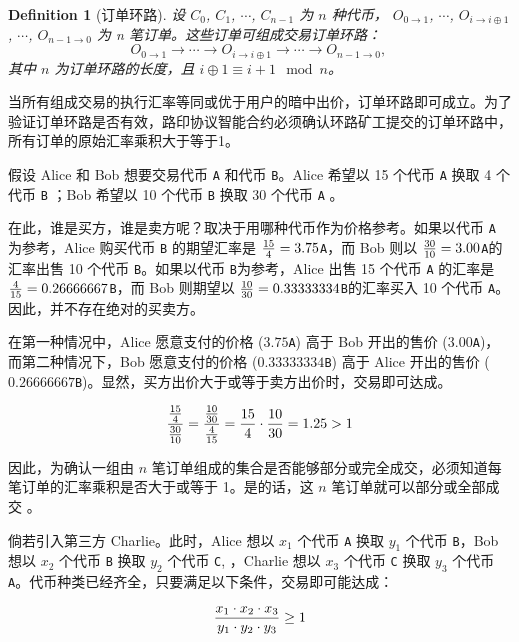 \documentclass[UTF8,nofonts]{ctexart}%
\newtheorem{definition}{Definition}[section]
\begin{document}
\begin{multicols}{2}
\begin{definition}[订单环路] 设 $C_{0}$, $C_{1}$, $\cdots$, $C_{n-1}$ 为 $n$ 种代币， $O_{0\rightarrow 1}$, $\cdots$, $O_{i\rightarrow i\oplus 1}$, $\cdots$, $O_{n-1 \rightarrow 0}$ 为 n 笔订单。这些订单可组成交易订单环路：
$$O_{0\rightarrow 1} \rightarrow \cdots \rightarrow O_{i\rightarrow i\oplus 1} \rightarrow \cdots \rightarrow O_{n-1\rightarrow 0} \text{, }$$
其中 $n$ 为订单环路的长度，且 $i\oplus 1 \equiv i+1 \mod n$。
\end{definition}

当所有组成交易的执行汇率等同或优于用户的暗中出价，订单环路即可成立。为了验证订单环路是否有效，路印协议智能合约必须确认环路矿工提交的订单环路中，所有订单的原始汇率乘积大于等于1。

假设 Alice 和 Bob 想要交易代币 \verb|A| 和代币 \verb|B|。Alice 希望以 15 个代币 \verb|A| 换取 4 个代币 \verb|B| ；Bob 希望以 10 个代币 \verb|B| 换取 30 个代币 \verb|A| 。

在此，谁是买方，谁是卖方呢？取决于用哪种代币作为价格参考。如果以代币 \verb|A| 为参考，Alice 购买代币 \verb|B| 的期望汇率是 ${15 \over 4} = 3.75$\verb|A|，而 Bob 则以 ${30 \over 10} = 3.00$\verb|A|的汇率出售 10 个代币 \verb|B|。如果以代币 \verb|B|为参考，Alice 出售 15 个代币 \verb|A| 的汇率是 ${4\over 15}=0.26666667$\verb|B|，而 Bob 则期望以 ${10 \over 30}=0.33333334$\verb|B|的汇率买入 10 个代币 \verb|A|。因此，并不存在绝对的买卖方。

在第一种情况中，Alice 愿意支付的价格 ($3.75$\verb|A|) 高于 Bob 开出的售价  ($3.00$\verb|A|)，而第二种情况下，Bob 愿意支付的价格 ($0.33333334$\verb|B|) 高于 Alice 开出的售价 ($0.26666667$\verb|B|)。显然，买方出价大于或等于卖方出价时，交易即可达成。

\begin{equation}
{{15\over 4} \over {30\over 10}} = {{10\over 30} \over {4\over 15}}={15 \over 4} \cdot {10 \over 30} = 1.25 > 1
\end{equation}

因此，为确认一组由 $n$ 笔订单组成的集合是否能够部分或完全成交，必须知道每笔订单的汇率乘积是否大于或等于 1。是的话，这 $n$ 笔订单就可以部分或全部成交 \cite{supersymmetry}。

倘若引入第三方 Charlie。此时，Alice 想以 $x_1$ 个代币 \verb|A| 换取 $y_1$ 个代币 \verb|B|，Bob 想以 $x_2$ 个代币 \verb|B| 换取 $y_2$ 个代币 \verb|C|, ，Charlie 想以 $x_3$ 个代币 \verb|C| 换取 $y_3$ 个代币 \verb|A|。代币种类已经齐全，只要满足以下条件，交易即可能达成：

\begin{equation}
{{x_1 \cdot x_2 \cdot x_3 \over y_1 \cdot y_2 \cdot y_3} \geq 1}
\end{equation}



\end{multicols}
\end{document}
